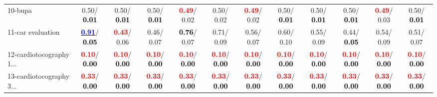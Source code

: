 \begin{table}[h]
\begin{center}
{\begin{tabular}{lc|c|c|c|c|c|c|c|c|c|c}
10-bupa &   0.50/\textcolor{black}{\textbf{  0.01}} &   0.50/\textcolor{black}{\textbf{  0.01}} &   0.50/\textcolor{black}{\textbf{  0.01}} & \textcolor{red}{\textbf{  0.49}}/  0.02 &   0.50/  0.02 & \textcolor{red}{\textbf{  0.49}}/  0.02 &   0.50/\textcolor{black}{\textbf{  0.01}} &   0.50/\textcolor{black}{\textbf{  0.01}} &   0.50/\textcolor{black}{\textbf{  0.01}} & \textcolor{red}{\textbf{  0.49}}/  0.03 &   0.50/\textcolor{black}{\textbf{  0.01}} \\
11-car evaluation & \underline{\textcolor{blue}{\textbf{  0.91}}}/\textcolor{black}{\textbf{  0.05}} & \textcolor{red}{\textbf{  0.43}}/  0.06 &   0.46/  0.07 & \textcolor{black}{\textbf{  0.76}}/  0.07 &   0.71/  0.09 &   0.56/  0.07 &   0.60/  0.10 &   0.55/  0.09 &   0.44/\textcolor{black}{\textbf{  0.05}} &   0.54/  0.09 &   0.51/  0.07 \\
12-cardiotocography 1... & \textcolor{red}{\textbf{  0.10}}/\textcolor{black}{\textbf{  0.00}} & \textcolor{red}{\textbf{  0.10}}/\textcolor{black}{\textbf{  0.00}} & \textcolor{red}{\textbf{  0.10}}/\textcolor{black}{\textbf{  0.00}} & \textcolor{red}{\textbf{  0.10}}/\textcolor{black}{\textbf{  0.00}} & \textcolor{red}{\textbf{  0.10}}/\textcolor{black}{\textbf{  0.00}} & \textcolor{red}{\textbf{  0.10}}/\textcolor{black}{\textbf{  0.00}} & \textcolor{red}{\textbf{  0.10}}/\textcolor{black}{\textbf{  0.00}} & \textcolor{red}{\textbf{  0.10}}/\textcolor{black}{\textbf{  0.00}} & \textcolor{red}{\textbf{  0.10}}/\textcolor{black}{\textbf{  0.00}} & \textcolor{red}{\textbf{  0.10}}/\textcolor{black}{\textbf{  0.00}} & \textcolor{red}{\textbf{  0.10}}/\textcolor{black}{\textbf{  0.00}} \\
13-cardiotocography 3... & \textcolor{red}{\textbf{  0.33}}/\textcolor{black}{\textbf{  0.00}} & \textcolor{red}{\textbf{  0.33}}/\textcolor{black}{\textbf{  0.00}} & \textcolor{red}{\textbf{  0.33}}/\textcolor{black}{\textbf{  0.00}} & \textcolor{red}{\textbf{  0.33}}/\textcolor{black}{\textbf{  0.00}} & \textcolor{red}{\textbf{  0.33}}/\textcolor{black}{\textbf{  0.00}} & \textcolor{red}{\textbf{  0.33}}/\textcolor{black}{\textbf{  0.00}} & \textcolor{red}{\textbf{  0.33}}/\textcolor{black}{\textbf{  0.00}} & \textcolor{red}{\textbf{  0.33}}/\textcolor{black}{\textbf{  0.00}} & \textcolor{red}{\textbf{  0.33}}/\textcolor{black}{\textbf{  0.00}} & \textcolor{red}{\textbf{  0.33}}/\textcolor{black}{\textbf{  0.00}} & \textcolor{red}{\textbf{  0.33}}/\textcolor{black}{\textbf{  0.00}} \\

\end{tabular}}
\end{center}
\end{table}
